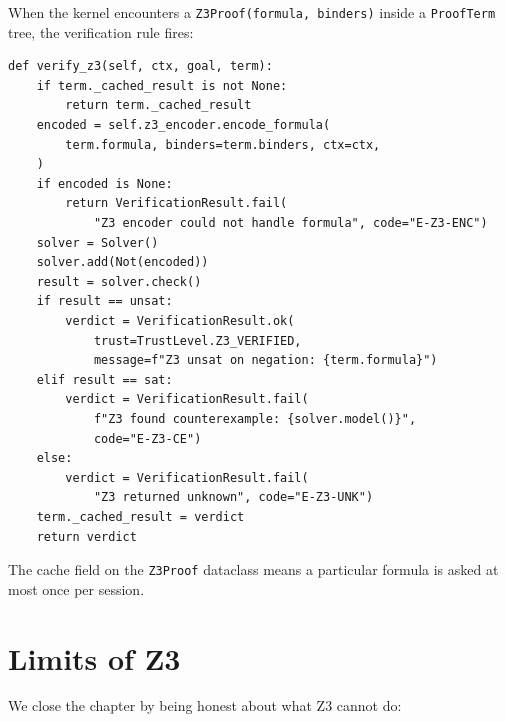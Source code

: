 When the kernel encounters a \texttt{Z3Proof(formula, binders)}
inside a \texttt{ProofTerm} tree, the verification rule fires:

\begin{lstlisting}[caption={\texttt{Z3Proof} verification rule
(paraphrased from the kernel).}]
def verify_z3(self, ctx, goal, term):
    if term._cached_result is not None:
        return term._cached_result
    encoded = self.z3_encoder.encode_formula(
        term.formula, binders=term.binders, ctx=ctx,
    )
    if encoded is None:
        return VerificationResult.fail(
            "Z3 encoder could not handle formula", code="E-Z3-ENC")
    solver = Solver()
    solver.add(Not(encoded))
    result = solver.check()
    if result == unsat:
        verdict = VerificationResult.ok(
            trust=TrustLevel.Z3_VERIFIED,
            message=f"Z3 unsat on negation: {term.formula}")
    elif result == sat:
        verdict = VerificationResult.fail(
            f"Z3 found counterexample: {solver.model()}",
            code="E-Z3-CE")
    else:
        verdict = VerificationResult.fail(
            "Z3 returned unknown", code="E-Z3-UNK")
    term._cached_result = verdict
    return verdict
\end{lstlisting}

The cache field on the \texttt{Z3Proof} dataclass means a
particular formula is asked at most once per session.

\section{Limits of Z3}

We close the chapter by being honest about what Z3 cannot do:

